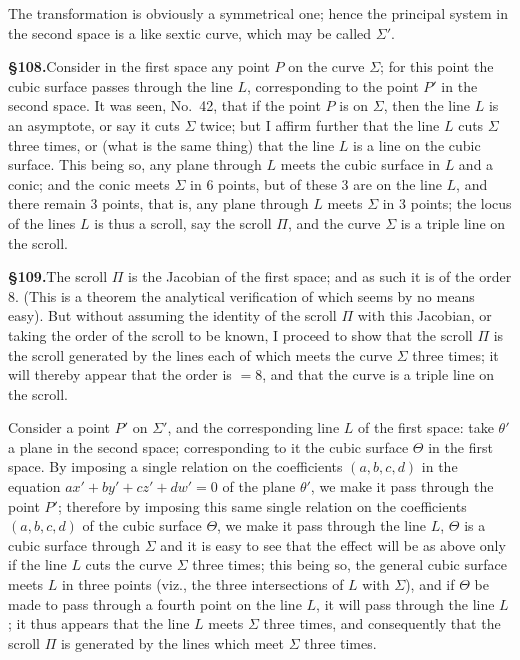 \documentclass[11pt,a4paper]{article}
\begin{document}
The transformation is obviously a symmetrical one; hence the principal system in the second space is a like sextic curve, which may be called $\Sigma'$.

\textbf{\S 108.}\quad Consider in the first space any point $P$ on the curve $\Sigma$; for this point the cubic surface passes through the line $L$, corresponding to the point $P'$ in the second space. It was seen, No.~42, that if the point $P$ is on $\Sigma$, then the line $L$ is an asymptote, or say it cuts $\Sigma$ twice; but I affirm further that the line $L$ cuts $\Sigma$ three times, or (what is the same thing) that the line $L$ is a line on the cubic surface. This being so, any plane through $L$ meets the cubic surface in $L$ and a conic; and the conic meets $\Sigma$ in $6$ points, but of these $3$ are on the line $L$, and there remain $3$ points, that is, any plane through $L$ meets $\Sigma$ in $3$ points; the locus of the lines $L$ is thus a scroll, say the scroll $\Pi$, and the curve $\Sigma$ is a triple line on the scroll.

\textbf{\S 109.}\quad The scroll $\Pi$ is the Jacobian of the first space; and as such it is of the order 8. (This is a theorem the analytical verification of which seems by no means easy). But without assuming the identity of the scroll $\Pi$ with this Jacobian, or taking the order of the scroll to be known, I proceed to show that the scroll $\Pi$ is the scroll generated by the lines each of which meets the curve $\Sigma$ three times; it will thereby appear that the order is $= 8$, and that the curve is a triple line on the scroll.

Consider a point $P'$ on $\Sigma'$, and the corresponding line $L$ of the first space: take $\theta'$ a plane in the second space; corresponding to it the cubic surface $\Theta$ in the first space. By imposing a single relation on the coefficients $(a, b, c, d)$ in the equation $ax' + by' + cz' + dw' = 0$ of the plane $\theta'$, we make it pass through the point $P'$; therefore by imposing this same single relation on the coefficients $(a, b, c, d)$ of the cubic surface $\Theta$, we make it pass through the line $L$, $\Theta$ is a cubic surface through $\Sigma$ and it is easy to see that the effect will be as above only if the line $L$ cuts the curve $\Sigma$ three times; this being so, the general cubic surface meets $L$ in three points (viz., the three intersections of $L$ with $\Sigma$), and if $\Theta$ be made to pass through a fourth point on the line $L$, it will pass through the line $L$; it thus appears that the line $L$ meets $\Sigma$ three times, and consequently that the scroll $\Pi$ is generated by the lines which meet $\Sigma$ three times.
\end{document}
